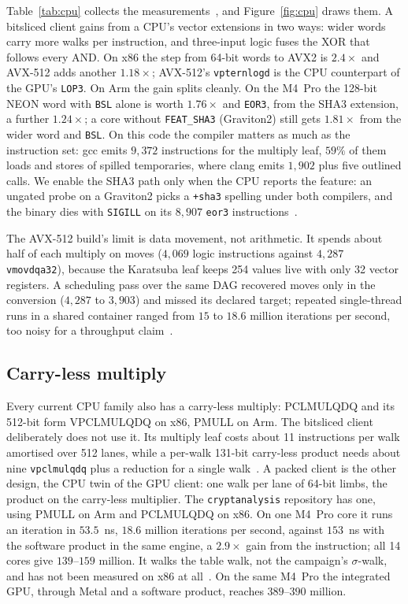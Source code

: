 Table~\ref{tab:cpu} collects the measurements~,
and Figure~\ref{fig:cpu} draws them. A bitsliced client gains from a
CPU's vector extensions in two ways: wider words carry more walks per
instruction, and three-input logic fuses the XOR that follows every AND.
On x86 the step from 64-bit words to AVX2 is $2.4\times$ and AVX-512 adds
another $1.18\times$; AVX-512's \texttt{vpternlogd} is the CPU counterpart
of the GPU's \texttt{LOP3}. On Arm the gain splits cleanly. On the
M4~Pro the 128-bit NEON word with \texttt{BSL} alone is worth $1.76\times$
and \texttt{EOR3}, from the SHA3 extension, a further $1.24\times$; a core
without \texttt{FEAT\_SHA3} (Graviton2) still gets $1.81\times$ from the
wider word and \texttt{BSL}. On this code the compiler matters as much as
the instruction set: gcc emits $9{,}372$ instructions for the multiply
leaf, $59\%$ of them loads and stores of spilled temporaries, where clang
emits $1{,}902$ plus five outlined calls. We enable the SHA3 path only when
the CPU reports the feature: an ungated probe on a Graviton2 picks a
\texttt{+sha3} spelling under both compilers, and the binary dies with
\texttt{SIGILL} on its $8{,}907$ \texttt{eor3}
instructions~.

The AVX-512 build's limit is data movement, not arithmetic. It spends
about half of each multiply on moves ($4{,}069$ logic instructions
against $4{,}287$ \texttt{vmovdqa32}), because the Karatsuba leaf keeps
254 values live with only 32 vector registers. A scheduling pass over
the same DAG recovered moves only in the conversion ($4{,}287$ to
$3{,}903$) and missed its declared target; repeated single-thread runs in
a shared container ranged from $15$ to $18.6$ million iterations per
second, too noisy for a throughput claim~.

\subsection{Carry-less multiply}
\label{sec:cpu-clmul}

Every current CPU family also has a carry-less multiply: PCLMULQDQ and
its 512-bit form VPCLMULQDQ on x86, PMULL on Arm. The bitsliced client
deliberately does not use it. Its multiply leaf costs about 11
instructions per walk amortised over 512 lanes, while a per-walk 131-bit
carry-less product needs about nine \texttt{vpclmulqdq} plus a reduction
for a single walk~. A packed client is the
other design, the CPU twin of the GPU client: one walk per lane of
64-bit limbs, the product on the carry-less multiplier. The
\texttt{cryptanalysis} repository has one, using PMULL on Arm and
PCLMULQDQ on x86. On one M4~Pro core it runs an iteration in $53.5$~ns,
$18.6$ million iterations per second, against $153$~ns with the software
product in the same engine, a $2.9\times$ gain from the instruction; all
14 cores give $139$--$159$ million. It walks the table walk, not the
campaign's $\sigma$-walk, and has not been measured on x86 at
all~. On the same M4~Pro the integrated GPU, through
Metal and a software product, reaches $389$--$390$ million.

